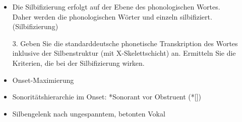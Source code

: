 {\begin{frame}
\begin{itemize}
		Stellen Sie fest, ob alle Silben wohlgeformt sind. Falls nicht, benennen Sie die Verletzungen	
	\begin{exe}
		\exi{(\ref{ex:HA2})} Urinstinkt (einfach nach Lautfolge):
		\begin{xlist}
			\ex \textipa{[Pu.\;RI.nStInkt]} (Onsetmaximierung)
			\ex {} (Sonoritätsprinzip,  ist extrasilbisch)
		\end{xlist}
	\end{exe}
      \item Die Silbifizierung erfolgt auf der Ebene des phonologischen Wortes.\\
        Daher werden die phonologischen Wörter  und  einzeln silbifiziert.
                  \ea
                   (Silbifizierung)
	          \z
	\end{itemize}
\end{frame}


\begin{frame}
	\begin{itemize}	
		\item[3.] Geben Sie die standarddeutsche phonetische Transkription des Wortes  inklusive der Silbenstruktur (mit X-Skelettschicht) an. Ermitteln Sie die Kriterien, die bei der Silbifizierung wirken.
	\end{itemize}
		
		\begin{minipage}{.5\textwidth}
			\begin{figure}
			\end{figure}
		\end{minipage}
	\begin{minipage}{.45\textwidth}
		\begin{itemize}
			\item Onset-Maximierung
			\item Sonoritätshierarchie im Onset: *Sonorant vor Obstruent (*[])
			\item Silbengelenk nach ungespanntem, betonten Vokal
		\end{itemize}
	\end{minipage}


\end{frame}}
